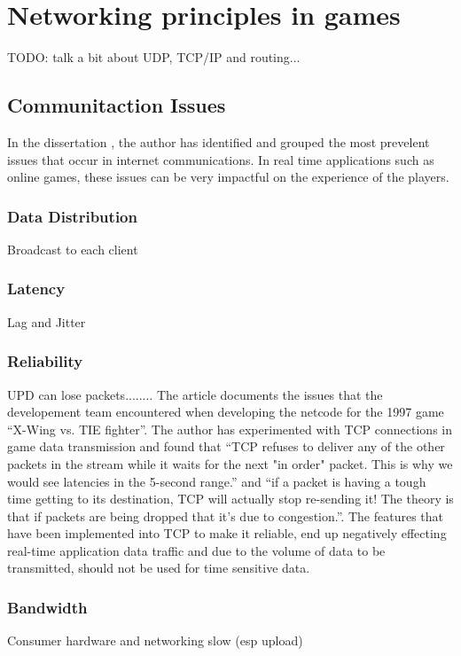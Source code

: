 \newpage
\section{Networking principles in games}
TODO: talk a bit about UDP, TCP/IP and routing...

\subsection{Communitaction Issues}

In the dissertation , the author has identified and grouped the most prevelent issues that occur in internet communications. In real time applications such as online games, these issues can be very impactful on the experience of the players.

\subsubsection{Data Distribution}
Broadcast to each client

\subsubsection{Latency}
Lag and Jitter

\subsubsection{Reliability}
UPD can lose packets........ The article  documents the issues that the developement team encountered when developing the netcode for the 1997 game ``X-Wing vs. TIE fighter''. The author has experimented with TCP connections in game data transmission and found that ``TCP refuses to deliver any of the other packets in the stream while it waits for the next "in order" packet. This is why we would see latencies in the 5-second range.'' and ``if a packet is having a tough time getting to its destination, TCP will actually stop re-sending it! The theory is that if packets are being dropped that it's due to congestion.''. The features that have been implemented into TCP to make it reliable, end up negatively effecting real-time application data traffic and due to the volume of data to be transmitted, should not be used for time sensitive data.

\subsubsection{Bandwidth}
Consumer hardware and networking slow (esp upload)


